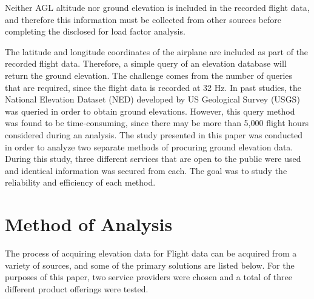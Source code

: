 \documentclass[conf]{new-aiaa}
\begin{document}
Neither AGL altitude nor ground elevation is included in the recorded flight data, and therefore this information must be collected from other sources before completing the disclosed for load factor analysis. 

The latitude and longitude coordinates of the airplane are included as part of the recorded flight data.  Therefore, a simple query of an elevation database will return the ground elevation.  The challenge comes from the number of queries that are required, since the flight data is recorded at 32 Hz. In past studies, the National Elevation Dataset (NED) developed by US Geological Survey (USGS) was queried in order to obtain ground elevations.  However, this query method was found to be time-consuming, since there may be more than 5,000 flight hours considered during an analysis.  The study presented in this paper was conducted in order to analyze two separate methods of procuring ground elevation data.  During this study, three different services that are open to the public were used and identical information was secured from each.  The goal was to study the reliability and efficiency of each method.  

\section{Method of Analysis}
The process of acquiring elevation data for Flight data can be acquired from a variety of sources, and some of the primary solutions are listed below. For the purposes of this paper, two service providers were chosen and a total of three different product offerings were tested.
\end{document}
